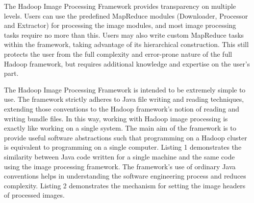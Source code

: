 \documentclass{osuthesis}
\begin{document}
				The Hadoop Image Processing Framework provides transparency on
				multiple levels.  Users can use the predefined MapReduce modules
				(Downloader, Processor and Extractor) for processing the image
				modules, and most image processing tasks require no more than this.
				Users may also write custom MapReduce tasks within the framework,
				taking advantage of its hierarchical construction.  This still
				protects the user from the full complexity and error-prone nature of
				the full Hadoop framework, but requires additional knowledge and
				expertise on the user's part.
				
				The Hadoop Image Processing Framework is intended to be extremely
				simple to use. The framework strictly adheres to Java file writing and
				reading techniques, extending those conventions to the Hadoop
				framework's notion of reading and writing bundle files.  In this way,
				working with Hadoop image processing is exactly like working on a
				single system.  The main aim of the framework is to provide useful
				software abstractions such that programming on a Hadoop cluster is
				equivalent to programming on a single computer.  Listing 1
				demonstrates the similarity between Java code written for a single
				machine and the same code using the image processing framework.  The
				framework's use of ordinary Java conventions helps in understanding
				the software engineering process and reduces complexity.  Listing 2
				demonstrates the mechanism for setting the image headers of processed
				images.
				
\end{document}
